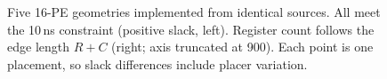 \begin{figure}[t]
  \centering
  \resizebox{\columnwidth}{!}{}
  \caption{Five 16-PE geometries implemented from identical sources. All
  meet the 10\,ns constraint (positive slack, left). Register count follows
  the edge length $R+C$ (right; axis truncated at 900). Each point is one
  placement, so slack differences include placer variation.}
  \label{fig:geometry}
\end{figure}
